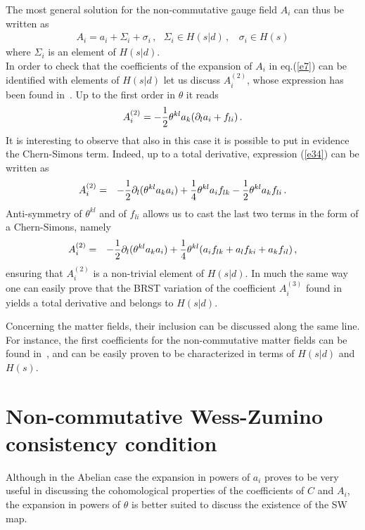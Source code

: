 \documentclass[a4paper,12pt]{article}
\begin{document}
The most general solution for the non-commutative gauge field
 $A_i$ can thus be written as
%
\begin{eqnarray}
A_i = a_i + \Sigma_i + \sigma_i \, ,
 ~~~\Sigma_i\in H(s|d)\,,~~~~\sigma_i\in H(s)
\label{e33}
\end{eqnarray}
%
where $\Sigma_i$ is an element of $H(s|d)$.
\\
In order to check that the coefficients of the expansion of $A_i$
 in eq.(\ref{e7}) can be identified with elements of $H(s|d)$ let us
 discuss $A^{(2)}_i$, whose expression has been found 
 in~\cite{Jurco:2001rq}.
Up to the first order in $\theta$ it reads
%
\begin{eqnarray}
A^{(2)}_i = - {1 \over 2} \theta^{kl} a_k (\partial_l a_i + f_{li}) \, .
\label{e34}
\end{eqnarray}
%
It is interesting to observe that also in this case it is possible to
 put in evidence the Chern-Simons term.
Indeed, up to a total derivative, expression (\ref{e34}) can be written as
%
\begin{eqnarray}
A^{(2)}_i & = & -{1 \over 2} \partial_l (\theta^{kl} a_k a_i)
+ {1 \over 4} \theta^{kl} a_i f_{lk} - {1 \over 2} \theta^{kl} a_k f_{li} \, .
\label{e35}
\end{eqnarray}
%
Anti-symmetry of $\theta^{kl}$ and of $f_{li}$ allows us to cast the last
 two terms in the form of a Chern-Simons, namely
%
\begin{eqnarray}
A^{(2)}_i & = & -{1 \over 2} \partial_l (\theta^{kl} a_k a_i)
+ {1 \over 4} \theta^{kl} ( a_i f_{lk}
+ a_l f_{ki} + a_k f_{il} ) \, ,
\label{e36}
\end{eqnarray}
%
ensuring that $A^{(2)}_i$ is a non-trivial element of $H(s|d)$.
In much the same way one can easily prove that the BRST variation
 of the coefficient $A_i^{(3)}$ found in~\cite{Okuyama:2001sw} yields
 a total derivative and belongs to $H(s|d)$.

Concerning the matter fields, their inclusion can
 be discussed along the same line. For instance, the first coefficients
 for the non-commutative matter fields can be found in~\cite{Jurco:2001rq},
 and can be easily proven to be characterized in terms of $H(s|d)$ and $H(s)$.

\section{Non-commutative Wess-Zumino consistency condition} \label{sec:WZ}

Although in the Abelian case the expansion in powers of $a_i$ proves
 to be very useful in discussing the cohomological properties of the
 coefficients of $C$ and $A_i$, the expansion in powers of $\theta$
 is better suited to discuss the existence of the SW map.
\end{document}
